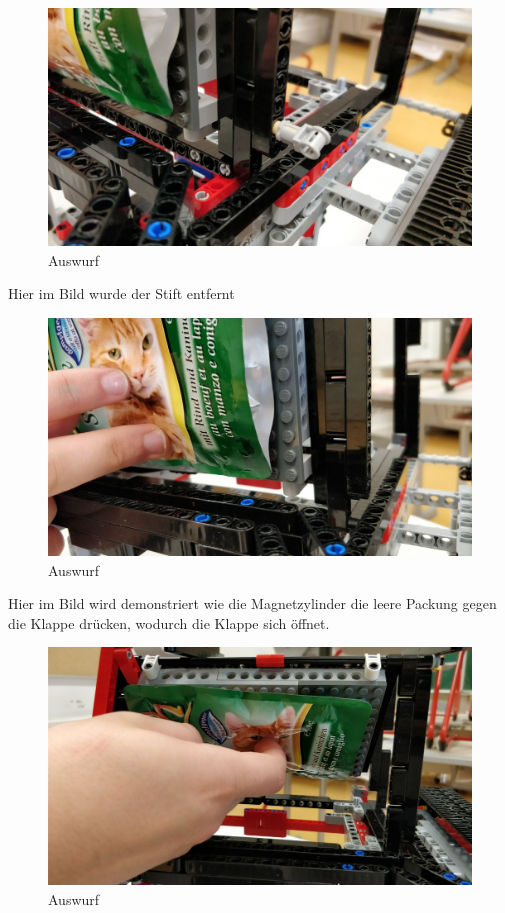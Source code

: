 \documentclass[a4paper,12pt]{scrartcl}
\begin{document}
\begin{figure}[H]
\begin{center}
\includegraphics[width=13cm]{Bilder/Ablauf_1_png/Auswurf_2}
\caption{Auswurf}
\end{center}
\end{figure}

Hier im Bild wurde der Stift entfernt 

\begin{figure}[H]
\begin{center}
\includegraphics[width=13cm]{Bilder/Ablauf_1_png/Auswurf_3}
\caption{Auswurf}
\end{center}
\end{figure}

Hier im Bild wird demonstriert wie die Magnetzylinder die leere Packung gegen die Klappe drücken, wodurch die Klappe sich öffnet.

\begin{figure}[H]
\begin{center}
\includegraphics[width=13cm]{Bilder/Ablauf_1_png/Auswurf_4}
\caption{Auswurf}
\end{center}
\end{figure}
\end{document}
